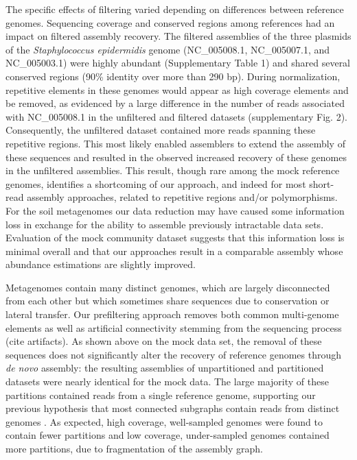 \documentclass{nature}%
\begin{document}
The specific effects of filtering varied depending on differences
between reference genomes.  Sequencing coverage and conserved regions
among references had an impact on filtered assembly recovery.  The
filtered assemblies of the three plasmids of the \emph{Staphylococcus
  epidermidis} genome (NC\_005008.1, NC\_005007.1, and NC\_005003.1)
were highly abundant (Supplementary Table 1) and shared several conserved
regions (90\% identity over more than 290 bp).  During normalization,
repetitive elements in these genomes would appear as high coverage
elements and be removed, as evidenced by a large difference in the
number of reads associated with NC\_005008.1 in the unfiltered and
filtered datasets (supplementary Fig. 2). Consequently, the unfiltered dataset
contained more reads spanning these repetitive regions.  This most
likely enabled assemblers to extend the assembly of these sequences
and resulted in the observed increased recovery of these genomes in
the unfiltered assemblies. This result, though rare among the mock
reference genomes, identifies a shortcoming of our approach, and
indeed for most short-read assembly approaches, related to repetitive
regions and/or polymorphisms.  For the soil metagenomes our data
reduction may have caused some information loss in exchange for the
ability to assemble previously intractable data sets.  Evaluation of
the mock community dataset suggests that this information loss is
minimal overall and that our approaches result in a comparable
assembly whose abundance estimations are slightly improved.


Metagenomes contain many distinct genomes, which are largely
disconnected from each other but which sometimes share sequences due
to conservation or lateral transfer.  Our prefiltering approach
removes both common multi-genome elements as well as artificial
connectivity stemming from the sequencing process (cite artifacts).
As shown above on the mock data set, the removal of these sequences
does not significantly alter the recovery of reference genomes through
{\em de novo} assembly: the resulting assemblies of unpartitioned and
partitioned datasets were nearly identical for the mock data.  The
large majority of these partitions contained reads from a single
reference genome, supporting our previous hypothesis that most
connected subgraphs contain reads from distinct genomes
\cite{Pell:2012cq}.  As expected, high coverage, well-sampled genomes
were found to contain fewer partitions and low coverage, under-sampled
genomes contained more partitions, due to fragmentation of the
assembly graph.
\end{document}
